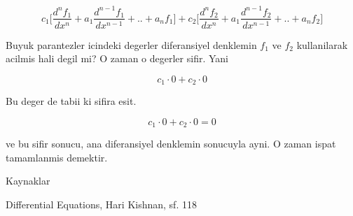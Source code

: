 \documentclass[12pt,fleqn]{article}\usepackage{../common}
\begin{document}
\[ 
c_1 \bigg[
\frac{d^nf_1}{dx^n} + a_1 \frac{d^{n-1}f_1}{dx^{n-1}} + .. + a_n f_1
\bigg] +
c_2 \bigg[
\frac{d^nf_2}{dx^n} + a_1 \frac{d^{n-1}f_2}{dx^{n-1}} + .. + a_n f_2
\bigg]
 \]

Buyuk parantezler icindeki degerler diferansiyel denklemin $f_1$ ve $f_2$
kullanilarak acilmis hali degil mi? O zaman o degerler sifir. Yani

\[ c_1 \cdot 0 + c_2 \cdot 0 \]

Bu deger de tabii ki sifira esit. 

\[ c_1 \cdot 0 + c_2 \cdot 0 = 0\]

ve bu sifir sonucu, ana diferansiyel denklemin sonucuyla ayni. O zaman
ispat tamamlanmis demektir.

Kaynaklar 

Differential Equations, Hari Kishnan, sf. 118
\end{document}
